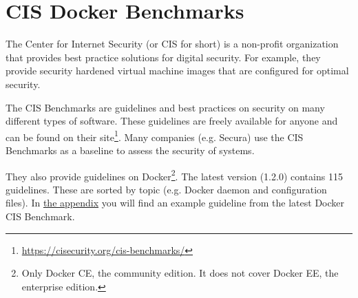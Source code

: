 \section{CIS Docker Benchmarks}
The Center for Internet Security (or CIS for short) is a non-profit organization that provides best practice solutions for digital security. For example, they provide security hardened virtual machine images that are configured for optimal security.

\hfill

The CIS Benchmarks are guidelines and best practices on security on many different types of software. These guidelines are freely available for anyone and can be found on their site\footnote{\url{https://cisecurity.org/cis-benchmarks/}}. Many companies (e.g. Secura) use the CIS Benchmarks as a baseline to assess the security of systems.

\hfill

They also provide guidelines on Docker\footnote{Only Docker CE, the community edition. It does not cover Docker EE, the enterprise edition.}. The latest version (1.2.0) contains 115 guidelines. These are sorted by topic (e.g. Docker daemon and configuration files). In \hyperref[appendix:CIS-Benchmark-Example]{the appendix} you will find an example guideline from the latest Docker CIS Benchmark.
